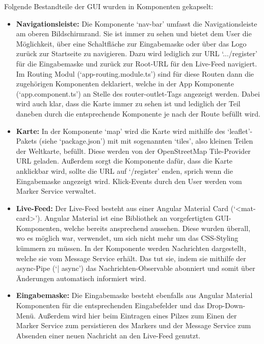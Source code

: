 \documentclass[../main.tex]{subfiles} %
\begin{document}
Folgende Bestandteile der GUI wurden in Komponenten gekapselt:

\begin{itemize}

	\item \textbf{Navigationsleiste:}
	      Die Komponente `nav-bar' umfasst die Navigationsleiste am oberen Bildschirmrand. Sie ist immer zu sehen und bietet dem User die Möglichkeit,
        über eine Schaltfläche zur Eingabemaske oder über das Logo zurück zur Startseite zu navigieren. Dazu wird lediglich zur URL `.../register' für die 
        Eingabemaske und zurück zur Root-URL für den Live-Feed navigiert. Im Routing Modul (`app-routing.module.ts') sind für diese Routen dann die
        zugehörigen Komponenten deklariert, welche in der App Komponente (`app.component.ts') an Stelle des router-outlet-Tags angezeigt werden.
        Dabei wird auch klar, dass die Karte immer zu sehen ist und lediglich der Teil daneben durch die entsprechende Komponente je nach der Route 
        befüllt wird. 

  \item \textbf{Karte:}
        In der Komponente `map' wird die Karte wird mithilfe des `leaflet'-Pakets (siehe `package.json') mit mit sogenannten `tiles', also kleinen 
        Teilen der Weltkarte, befüllt. Diese werden von der OpenStreetMap Tile-Provider URL geladen. Außerdem sorgt die Komponente dafür, dass die Karte 
        anklickbar wird, sollte die URL auf `/register' enden, sprich wenn die Eingabemaske angezeigt wird. Klick-Events durch den User werden vom Marker 
        Service verwaltet.

  \item \textbf{Live-Feed:}
        Der Live-Feed besteht aus einer Angular Material Card (`<mat-card>'). Angular Material ist eine Bibliothek an vorgefertigten GUI-Komponenten,
        welche bereits ansprechend aussehen. Diese wurden überall, wo es möglich war, verwendet, um sich nicht mehr um das CSS-Styling kümmern zu müssen.
        In der Komponente werden Nachrichten dargestellt, welche sie vom Message Service erhält. Das tut sie, indem sie mithilfe der async-Pipe (`| async') 
        das Nachrichten-Observable abonniert und somit über Änderungen automatisch informiert wird. 

  \item \textbf{Eingabemaske:}
        Die Eingabemaske besteht ebenfalls aus Angular Material Komponenten für die entsprechenden Eingabefelder und das Drop-Down-Menü. Außerdem wird
        hier beim Eintragen eines Pilzes zum Einen der Marker Service zum persistieren des Markers und der Message Service zum Absenden einer neuen 
        Nachricht an den Live-Feed genutzt.

\end{itemize}
\end{document}
